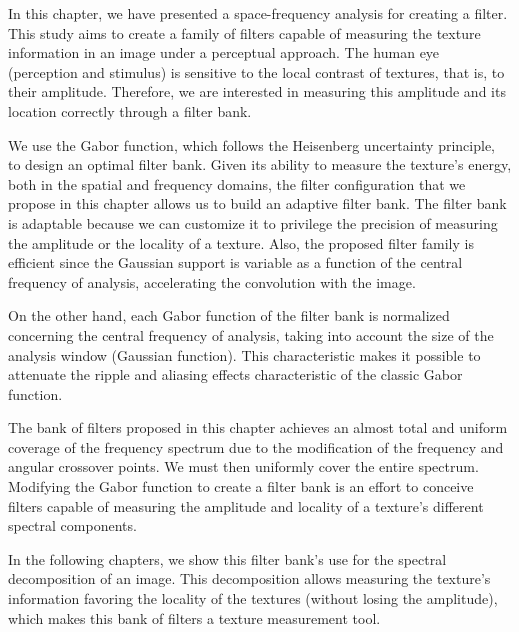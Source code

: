 In this chapter, we have presented a space-frequency analysis for creating a filter. This study aims to create a family of filters capable of measuring the texture information in an image under a perceptual approach. The human eye (perception and stimulus) is sensitive to the local contrast of textures, that is, to their amplitude. Therefore, we are interested in measuring this amplitude and its location correctly through a filter bank.

We use the Gabor function, which follows the Heisenberg uncertainty principle, to design an optimal filter bank. Given its ability to measure the texture's energy, both in the spatial and frequency domains, the filter configuration that we propose in this chapter allows us to build an adaptive filter bank. The filter bank is adaptable because we can customize it to privilege the precision of measuring the amplitude or the locality of a texture. Also, the proposed filter family is efficient since the Gaussian support is variable as a function of the central frequency of analysis, accelerating the convolution with the image.

On the other hand, each Gabor function of the filter bank is normalized concerning the central frequency of analysis, taking into account the size of the analysis window (Gaussian function). This characteristic makes it possible to attenuate the ripple and aliasing effects characteristic of the classic Gabor function.

The bank of filters proposed in this chapter achieves an almost total and uniform coverage of the frequency spectrum due to the modification of the frequency and angular crossover points.
We must then uniformly cover the entire spectrum. Modifying the Gabor function to create a filter bank is an effort to conceive filters capable of measuring the amplitude and locality of a texture's different spectral components. 

In the following chapters, we show this filter bank's use for the spectral decomposition of an image. This decomposition allows measuring the texture's information favoring the locality of the textures (without losing the amplitude), which makes this bank of filters a texture measurement tool.
